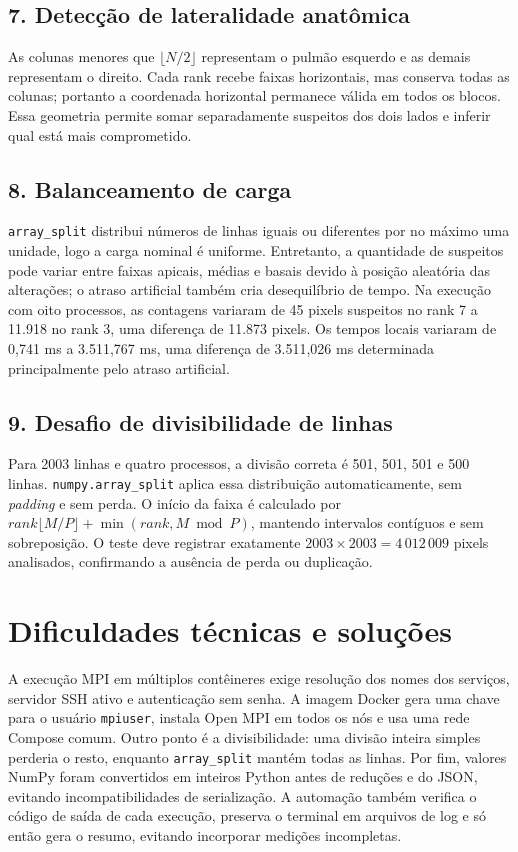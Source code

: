 \documentclass[12pt,a4paper]{article}
\begin{document}
\subsection*{7. Detecção de lateralidade anatômica}
As colunas menores que $\lfloor N/2\rfloor$ representam o pulmão esquerdo e as
demais representam o direito. Cada rank recebe faixas horizontais, mas conserva
todas as colunas; portanto a coordenada horizontal permanece válida em todos os
blocos. Essa geometria permite somar separadamente suspeitos dos dois lados e
inferir qual está mais comprometido.

\subsection*{8. Balanceamento de carga}
\texttt{array\_split} distribui números de linhas iguais ou diferentes por no
máximo uma unidade, logo a carga nominal é uniforme. Entretanto, a quantidade
de suspeitos pode variar entre faixas apicais, médias e basais devido à posição
aleatória das alterações; o atraso artificial também cria desequilíbrio de
tempo. Na execução com oito processos, as contagens variaram de 45 pixels
suspeitos no rank 7 a 11.918 no rank 3, uma diferença de 11.873 pixels. Os
tempos locais variaram de 0,741 ms a 3.511,767 ms, uma diferença de
3.511,026 ms determinada principalmente pelo atraso artificial.

\subsection*{9. Desafio de divisibilidade de linhas}
Para 2003 linhas e quatro processos, a divisão correta é 501, 501, 501 e 500
linhas. \texttt{numpy.array\_split} aplica essa distribuição automaticamente,
sem \emph{padding} e sem perda. O início da faixa é calculado por
$rank\lfloor M/P\rfloor+\min(rank,M\bmod P)$, mantendo intervalos contíguos e
sem sobreposição. O teste deve registrar exatamente
$2003\times2003=4\,012\,009$ pixels analisados, confirmando a ausência de perda
ou duplicação.

\section{Dificuldades técnicas e soluções}

A execução MPI em múltiplos contêineres exige resolução dos nomes dos serviços,
servidor SSH ativo e autenticação sem senha. A imagem Docker gera uma chave para
o usuário \texttt{mpiuser}, instala Open MPI em todos os nós e usa uma rede
Compose comum. Outro ponto é a divisibilidade: uma divisão inteira simples
perderia o resto, enquanto \texttt{array\_split} mantém todas as linhas. Por
fim, valores NumPy foram convertidos em inteiros Python antes de reduções e do
JSON, evitando incompatibilidades de serialização. A automação também verifica
o código de saída de cada execução, preserva o terminal em arquivos de log e
só então gera o resumo, evitando incorporar medições incompletas.
\end{document}
